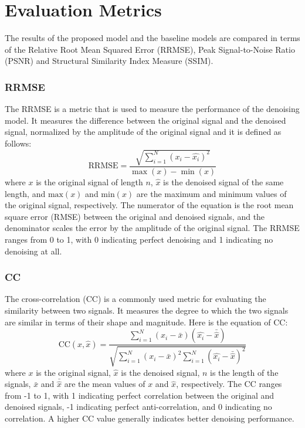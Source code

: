\documentclass[a4paper]{sapthesis}
\begin{document}
\section{Evaluation Metrics}
The results of the proposed model and the baseline models are compared 
in terms of the Relative Root Mean Squared Error (RRMSE), Peak 
Signal-to-Noise Ratio (PSNR) and Structural Similarity Index Measure (SSIM).
\subsubsection{RRMSE}
The RRMSE is a metric that is used to measure the performance of the
denoising model. It measures the difference between the original signal
 and the denoised signal, normalized by the amplitude of the original 
 signal and it is defined as follows:
\begin{equation}
\text{RRMSE} = \frac{\sqrt{\sum_{i=1}^{N} (x_i - \hat{x_i})^2}}{\max(x) - \min(x)}
\end{equation}
where $x$ is the original signal of length $n$, $\hat{x}$ is the denoised 
signal of the same length, and $\text{max}(x)$ and $\text{min}(x)$ are the 
maximum and minimum values of the original signal, respectively. The 
numerator of the equation is the root mean square error (RMSE) between 
the original and denoised signals, and the denominator scales the error 
by the amplitude of the original signal.\newline
The RRMSE ranges from 0 to 1, 
with 0 indicating perfect denoising and 1 indicating no denoising at all.
\subsubsection{CC}
The cross-correlation (CC) is a commonly used metric for evaluating the
 similarity between two signals. It measures the degree to which the two
  signals are similar in terms of their shape and magnitude. Here is the 
equation of CC:
\begin{equation}
\text{CC}(x,\hat{x}) = \frac{\sum_{i=1}^{N} (x_i - \bar{x})(\hat{x_i} - \bar{\hat{x}})}{\sqrt{\sum_{i=1}^{N} (x_i - \bar{x})^2 \sum_{i=1}^{N} (\hat{x_i} - \bar{\hat{x}})^2}}
\end{equation}
where $x$ is the original signal, $\hat{x}$ is the denoised signal, 
$n$ is the length of the signals, $\bar{x}$ and $\bar{\hat{x}}$ are 
the mean values of $x$ and $\hat{x}$, respectively.\newline
The CC ranges from -1 to 1, with 1 indicating perfect correlation between 
the original and denoised signals, -1 indicating perfect anti-correlation, 
and 0 indicating no correlation. A higher CC value generally indicates 
better denoising performance.
\end{document}

